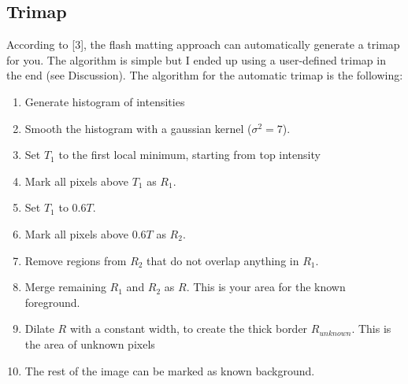 \documentclass[10pt,letterpaper,twocolumn]{article}
\begin{document}
\subsection{Trimap}
According to [3], the flash matting approach can automatically generate a trimap for you. The algorithm is simple but I ended up using a user-defined trimap in the end (see Discussion). The algorithm for the automatic trimap is the following:
\begin{enumerate}
\item Generate histogram of intensities
\item Smooth the histogram with a gaussian kernel ($\sigma^2 = 7$).
\item Set $T_1$ to the first local minimum, starting from top intensity
\item Mark all pixels above $T_1$ as $R_1$.
\item Set $T_1$ to $0.6T$.
\item Mark all pixels above $0.6T$ as $R_2$.
\item Remove regions from $R_2$ that do not overlap anything in $R_1$.
\item Merge remaining $R_1$ and $R_2$ as $R$. This is your area for the known foreground.
\item Dilate $R$ with a constant width, to create the thick border $R_{unknown}$. This is the area of unknown pixels
\item The rest of the image can be marked as known background.
\end{enumerate}
\end{document}
